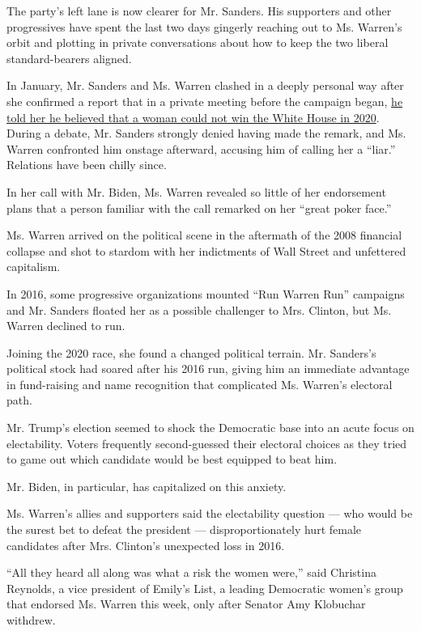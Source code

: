 The party's left lane is now clearer for Mr. Sanders. His supporters and
other progressives have spent the last two days gingerly reaching out to
Ms. Warren's orbit and plotting in private conversations about how to
keep the two liberal standard-bearers aligned.

In January, Mr. Sanders and Ms. Warren clashed in a deeply personal way
after she confirmed a report that in a private meeting before the
campaign began,
\href{https://www.nytimes.com/2020/01/13/us/politics/bernie-sanders-elizabeth-warren-woman-president.html}{he
told her he believed that a woman could not win the White House in
2020}. During a debate, Mr. Sanders strongly denied having made the
remark, and Ms. Warren confronted him onstage afterward, accusing him of
calling her a ``liar.'' Relations have been chilly since.

In her call with Mr. Biden, Ms. Warren revealed so little of her
endorsement plans that a person familiar with the call remarked on her
``great poker face.''

Ms. Warren arrived on the political scene in the aftermath of the 2008
financial collapse and shot to stardom with her indictments of Wall
Street and unfettered capitalism.

In 2016, some progressive organizations mounted ``Run Warren Run''
campaigns and Mr. Sanders floated her as a possible challenger to Mrs.
Clinton, but Ms. Warren declined to run.

Joining the 2020 race, she found a changed political terrain. Mr.
Sanders's political stock had soared after his 2016 run, giving him an
immediate advantage in fund-raising and name recognition that
complicated Ms. Warren's electoral path.

Mr. Trump's election seemed to shock the Democratic base into an acute
focus on electability. Voters frequently second-guessed their electoral
choices as they tried to game out which candidate would be best equipped
to beat him.

Mr. Biden, in particular, has capitalized on this anxiety.

Ms. Warren's allies and supporters said the electability question ---
who would be the surest bet to defeat the president ---
disproportionately hurt female candidates after Mrs. Clinton's
unexpected loss in 2016.

``All they heard all along was what a risk the women were,'' said
Christina Reynolds, a vice president of Emily's List, a leading
Democratic women's group that endorsed Ms. Warren this week, only after
Senator Amy Klobuchar withdrew.

